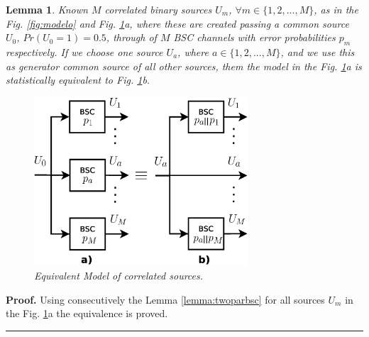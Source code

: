 \documentclass[journal]{IEEEtran}
\newtheorem{lemma}[theorem]{Lemma}
\newenvironment{proof}[1][Proof]{\textbf{#1.} }{\ \rule{0.5em}{0.5em}}
\begin{document}
\begin{lemma}
\label{lemma:twoparbsc2}
Known $M$ correlated binary sources $U_m$, $\forall m \in \{1, 2, ..., M\}$, as 
in the Fig. \ref{fig:modelo} and Fig. \ref{fig:sources}a, where these are created 
passing a common source $U_0$, $Pr(U_0=1)=0.5$, through of $M$ BSC channels with 
error probabilities $p_m$ respectively. If we choose one source $U_a$, where 
$a \in \{1, 2, ..., M\}$, and we use this as generator common source of all other 
sources, them the model in the  Fig. \ref{fig:sources}a is statistically equivalent 
to Fig. \ref{fig:sources}b.
\begin{figure}[h!bt]
\centering
\includegraphics[width=8.0cm]{sources.eps}
\caption{Equivalent Model of correlated sources.} \label{fig:sources}
\end{figure} 
\end{lemma}
\begin{proof}
\label{proof:twoparbsc2} 
Using consecutively the Lemma \ref{lemma:twoparbsc} for all sources $U_m$ in 
the Fig. \ref{fig:sources}a the equivalence is proved.
\end{proof}
\end{document}
